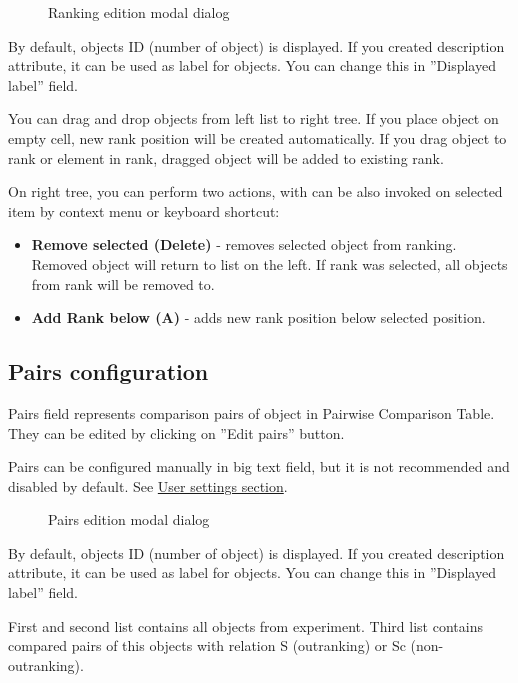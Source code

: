 \begin{figure*}[!ht] 
	\centering
	\caption{Ranking edition modal dialog}
\end{figure*}

By default, objects ID (number of object) is displayed. If you created description attribute, it can be used as label for objects. You can change this in ''Displayed label'' field.

You can drag and drop objects from left list to right tree. If you place object on empty cell, new rank position will be created automatically. If you drag object to rank or element in rank, dragged object will be added to existing rank.

On right tree, you can perform two actions, with can be also invoked on selected item by context menu or keyboard shortcut:
\begin{itemize}
	\item \textbf{Remove selected (Delete)} - removes selected object from ranking. Removed object will return to list on the left. If rank was selected, all objects from rank will be removed to.
	\item \textbf{Add Rank below (A)} - adds new rank position below selected position.
\end{itemize}


\subsection{Pairs configuration}\label{sub:properties-pairs}

Pairs field represents comparison pairs of object in Pairwise Comparison Table. They can be edited by clicking on ''Edit pairs'' button.

Pairs can be configured manually in big text field, but it is not recommended and disabled by default. See \hyperref[section:user-settings]{User settings section}.

\begin{figure*}[!ht] 
	\centering
	\caption{Pairs edition modal dialog}
\end{figure*}

By default, objects ID (number of object) is displayed. If you created description attribute, it can be used as label for objects. You can change this in ''Displayed label'' field. 

First and second list contains all objects from experiment. Third list contains compared pairs of this objects with relation S (outranking) or Sc (non-outranking).

